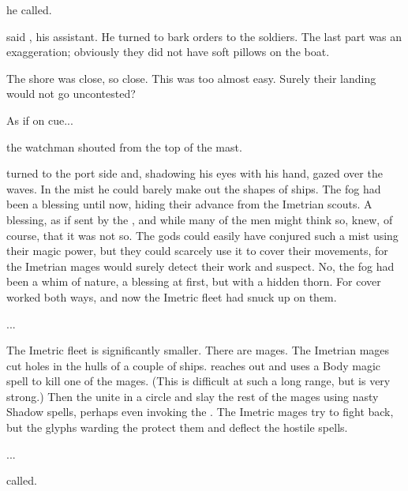 \ta{\Ondmyst{}!} he called. 

 said \Kufur{}, his assistant. He turned to bark orders to the soldiers.  The last part was an exaggeration; obviously they did not have soft pillows on the boat. 

The shore was close, so close. This was too almost easy. Surely their landing would not go uncontested? 

As if on cue...

 the watchman shouted from the top of the mast. 

\Narkiza{} turned to the port side and, shadowing his eyes with his hand, gazed over the waves. In the mist he could barely make out the shapes of ships. The fog had been a blessing until now, hiding their advance from the Imetrian scouts. A blessing, as if sent by the \Annunaki, and while many of the men might think so, \Narkiza{} knew, of course, that it was not so. The gods could easily have conjured such a mist using their magic power, but they could scarcely use it to cover their movements, for the Imetrian mages would surely detect their work and suspect. No, the fog had been a whim of nature, a blessing at first, but with a hidden thorn. For cover worked both ways, and now the Imetric fleet had snuck up on them. 


...

The Imetric fleet is significantly smaller. There are mages. The Imetrian mages cut holes in the hulls of a couple of ships. \Narkiza{} reaches out and uses a Body magic spell to kill one of the mages. (This is difficult at such a long range, but \Narkiza{} is very strong.) Then the \Shesshefkesad{} unite in a circle and slay the rest of the mages using nasty Shadow spells, perhaps even invoking the \Maskim. The Imetric mages try to fight back, but the glyphs warding the \MotherTiamat{} protect them and deflect the hostile spells. 

...

 \Narkiza{} called.  

